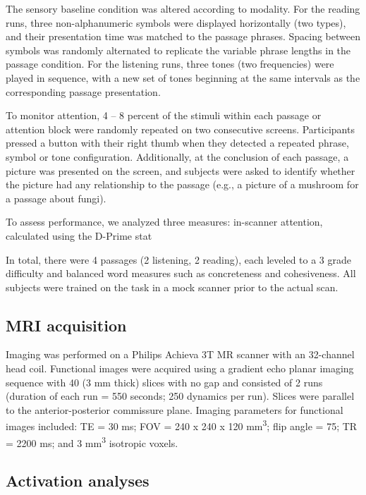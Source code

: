 The sensory baseline condition was altered according to modality. For the reading runs, three non-alphanumeric symbols were displayed horizontally (two types), and their presentation time was matched to the passage phrases. Spacing between symbols was randomly alternated to replicate the variable phrase lengths in the passage condition. For the listening runs, three tones (two frequencies) were played in sequence, with a new set of tones beginning at the same intervals as the corresponding passage presentation. 

To monitor attention, 4 – 8 percent of the stimuli within each passage or attention block were randomly repeated on two consecutive screens.  Participants pressed a button with their right thumb when they detected a repeated phrase, symbol or tone configuration. Additionally, at the conclusion of each passage, a picture was presented on the screen, and subjects were asked to identify whether the picture had any relationship to the passage (e.g., a picture of a mushroom for a passage about fungi). 

To assess performance, we analyzed three measures: in-scanner attention, calculated using the D-Prime stat

In total, there were 4 passages (2 listening, 2 reading), each leveled to a 3 grade difficulty and balanced word measures such as concreteness and cohesiveness.  All subjects were trained on the task in a mock scanner prior to the actual scan. 


\subsection{MRI acquisition}

Imaging was performed on a Philips Achieva 3T MR scanner with an 32-channel head coil. Functional images were acquired using a gradient echo planar imaging sequence with 40 (3 mm thick) slices with no gap and consisted of 2 runs (duration of each run = 550 seconds; 250 dynamics per run). Slices were parallel to the anterior-posterior commissure plane. Imaging parameters for functional images included: TE = 30 ms; FOV = 240 x 240 x 120 mm\textsuperscript{3}; flip angle = 75\degree; TR = 2200 ms; and 3 mm\textsuperscript{3} isotropic voxels.

\subsection{Activation analyses}

